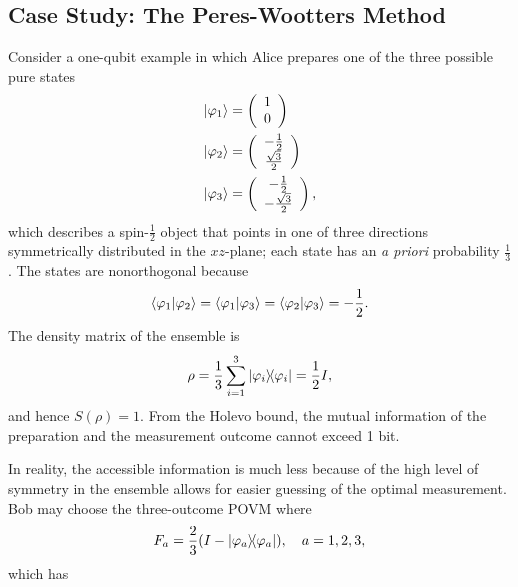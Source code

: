 \documentclass[a4paper, 12pt]{article}
\numberwithin{equation}{section}
\numberwithin{figure}{section}
\theoremstyle{definition}
\begin{document}
    \subsection{Case Study: The Peres-Wootters Method}
    Consider a one-qubit example in which Alice prepares one of the three possible pure states
    \begin{align}
        \ket{\varphi_1} &= \left( \begin{array}{c}
            1 \\
            0
        \end{array} \right) \\
        \ket{\varphi_2} &= \left( \begin{array}{c}
            -\frac{1}{2} \\
            \frac{\sqrt{3}}{2}
        \end{array} \right) \\
        \ket{\varphi_3} &= \left( \begin{array}{c}
            -\frac{1}{2} \\
            -\frac{\sqrt{3}}{2}
        \end{array} \right),
    \end{align}
    which describes a spin-$\frac{1}{2}$ object that points in one of three directions symmetrically distributed in the $xz$-plane; each state has an \textit{a priori} probability $\frac{1}{3}$. The states are nonorthogonal because
    \begin{align}
        \braket{\varphi_1}{\varphi_2} = \braket{\varphi_1}{\varphi_3} = \braket{\varphi_2}{\varphi_3} = -\frac{1}{2}. \label{eq:inner3}
    \end{align}
    The density matrix of the ensemble is
    \begin{align}
        \rho = \frac{1}{3} \sum_{i = 1}^3 \dyad{\varphi_i}{\varphi_i} = \frac{1}{2} I,
    \end{align}
    and hence $S(\rho) = 1$. From the Holevo bound, the mutual information of the preparation and the measurement outcome cannot exceed 1 bit. \par
    In reality, the accessible information is much less because of the high level of symmetry in the ensemble allows for easier guessing of the optimal measurement. Bob may choose the three-outcome POVM where
    \begin{align}
        F_a = \frac{2}{3}(I - \dyad{\varphi_a}{\varphi_a}), \quad a = 1, 2, 3, \label{eq:povm3}
    \end{align}
    which has
\end{document}
